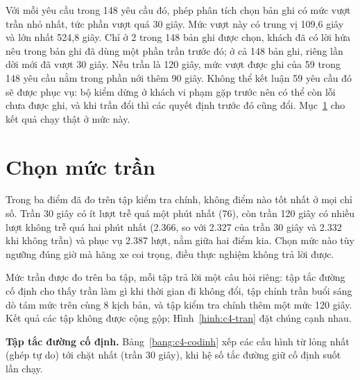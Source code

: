 Với mỗi yêu cầu trong 148 yêu cầu đó, phép phân tích chọn bản ghi có mức vượt trần nhỏ nhất, tức phần vượt quá 30
giây. Mức vượt này có trung vị 109,6 giây và lớn nhất 524,8 giây. Chỉ ở 2 trong 148 bản ghi được chọn, khách đã có
lời hứa nêu trong bản ghi đã dùng một phần trần trước đó; ở cả 148 bản ghi, riêng lần dời mới đã vượt 30 giây. Nếu trần là 120 giây, mức vượt
được ghi của 59 trong 148 yêu cầu nằm trong phần nới thêm 90 giây. Không thể kết luận 59 yêu cầu đó sẽ được phục vụ:
bộ kiểm dừng ở khách vi phạm gặp trước nên có thể còn lỗi chưa được ghi, và khi trần đổi thì các quyết định trước đó
cũng đổi. Mục~\ref{muc:c4-chontran} cho kết quả chạy thật ở mức này.

\section{Chọn mức trần}
\label{muc:c4-chontran}

Trong ba điểm đã đo trên tập kiểm tra chính, không điểm nào tốt nhất ở mọi chỉ số. Trần 30 giây có ít lượt trễ quá
một phút nhất (76), còn trần 120 giây có nhiều lượt không trễ quá hai phút nhất (2.366, so với 2.327 của trần 30
giây và 2.332 khi không trần) và phục vụ 2.387 lượt, nằm giữa hai điểm kia. Chọn mức nào tùy ngưỡng đúng giờ mà hãng
xe coi trọng, điều thực nghiệm không trả lời được.

Mức trần được đo trên ba tập, mỗi tập trả lời một câu hỏi riêng: tập tắc đường cố định cho thấy trần làm gì khi
thời gian đi không đổi, tập chỉnh trần buổi sáng dò tám mức trên cùng 8 kịch bản, và tập kiểm tra chính thêm một mức
120 giây. Kết quả các tập không được cộng gộp; Hình~\ref{hinh:c4-tran} đặt chúng cạnh nhau.

\textbf{Tập tắc đường cố định.} Bảng~\ref{bang:c4-codinh} xếp các cấu hình từ lỏng nhất (ghép tự do) tới chặt nhất
(trần 30 giây), khi hệ số tắc đường giữ cố định suốt lần chạy.


